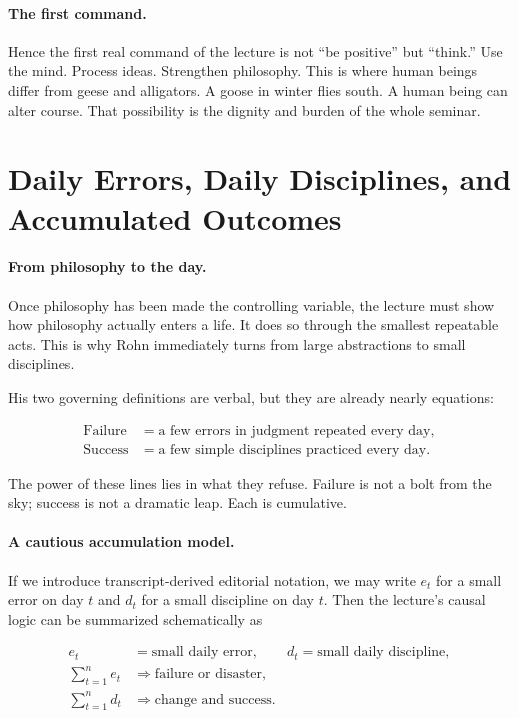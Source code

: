 \paragraph{The first command.}
Hence the first real command of the lecture is not ``be positive'' but ``think.'' Use the mind. Process ideas. Strengthen philosophy. This is where human beings differ from geese and alligators. A goose in winter flies south. A human being can alter course. That possibility is the dignity and burden of the whole seminar.

\section{Daily Errors, Daily Disciplines, and Accumulated Outcomes}

\paragraph{From philosophy to the day.}
Once philosophy has been made the controlling variable, the lecture must show how philosophy actually enters a life. It does so through the smallest repeatable acts. This is why Rohn immediately turns from large abstractions to small disciplines.

His two governing definitions are verbal, but they are already nearly equations:

\begin{align}
\text{Failure} &= \text{a few errors in judgment repeated every day}, \\
\text{Success} &= \text{a few simple disciplines practiced every day}.
\end{align}

The power of these lines lies in what they refuse. Failure is not a bolt from the sky; success is not a dramatic leap. Each is cumulative.

\paragraph{A cautious accumulation model.}
If we introduce transcript-derived editorial notation, we may write \(e_t\) for a small error on day \(t\) and \(d_t\) for a small discipline on day \(t\). Then the lecture's causal logic can be summarized schematically as

\begin{align}
e_t &= \text{small daily error}, \qquad d_t = \text{small daily discipline}, \\
\sum_{t=1}^{n} e_t &\Rightarrow \text{failure or disaster}, \\
\sum_{t=1}^{n} d_t &\Rightarrow \text{change and success}.
\end{align}

